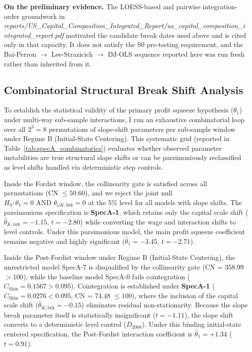 \documentclass[11pt,a4paper]{article}
\begin{document}
\textbf{On the preliminary evidence.} The LOESS-based and pairwise integration-order groundwork in \textit{reports/US\_Capital\_Composition\_Integrated\_Report/us\_capital\_composition\_integrated\_report.pdf} motivated the candidate break dates used above and is cited only in that capacity. It does not satisfy the S0\* pre-testing requirement, and the Bai-Perron $\to$ Lee-Strazicich $\to$ IM-OLS sequence reported here was run fresh rather than inherited from it.

\subsection{Combinatorial Structural Break Shift Analysis}

To establish the statistical validity of the primary profit squeeze hypothesis ($\theta_1$) under multi-way sub-sample interactions, I run an exhaustive combinatorial loop over all $2^3 = 8$ permutations of slope-shift parameters per sub-sample window under Regime B (Initial-State Centering). This systematic grid (reported in Table~\ref{tab:specA_combinatorics}) evaluates whether observed parameter instabilities are true structural slope shifts or can be parsimoniously reclassified as level shifts handled via deterministic step controls.

Inside the Fordist window, the collinearity gate is satisfied across all permutations (CN $\le 50.60$), and we reject the joint null $H_0: \theta_1 = 0 \text{ AND } \theta_{\omega K, \text{brk}} = 0$ at the 5\% level for all models with slope shifts. The parsimonious specification is \textbf{SpecA-1}, which retains only the capital scale shift ($\hat{\theta}_{K,\text{brk}} = -1.15$, $t = -2.80$) while converting the wage and interaction shifts to level controls. Under this parsimonious model, the main profit squeeze coefficient remains negative and highly significant ($\hat{\theta}_1 = -3.45$, $t = -2.71$).

Inside the Post-Fordist window under Regime B (Initial-State Centering), the unrestricted model SpecA-7 is disqualified by the collinearity gate (CN = 358.99 $> 100$), while the baseline model SpecA-0 fails cointegration ($C_{\text{Shin}} = 0.1567 > 0.095$). Cointegration is established under \textbf{SpecA-1} ($C_{\text{Shin}} = 0.0276 < 0.095$, CN = 74.48 $\le 100$), where the inclusion of the capital scale shift ($\hat{\theta}_{K,\text{brk}} = -0.15$) eliminates residual non-stationarity. Because the slope break parameter itself is statistically insignificant ($t = -1.11$), the slope shift converts to a deterministic level control ($D_{2008}$). Under this binding initial-state centered specification, the Post-Fordist interaction coefficient is $\hat{\theta}_1 = +1.34$ ($t = 0.91$).
\end{document}
